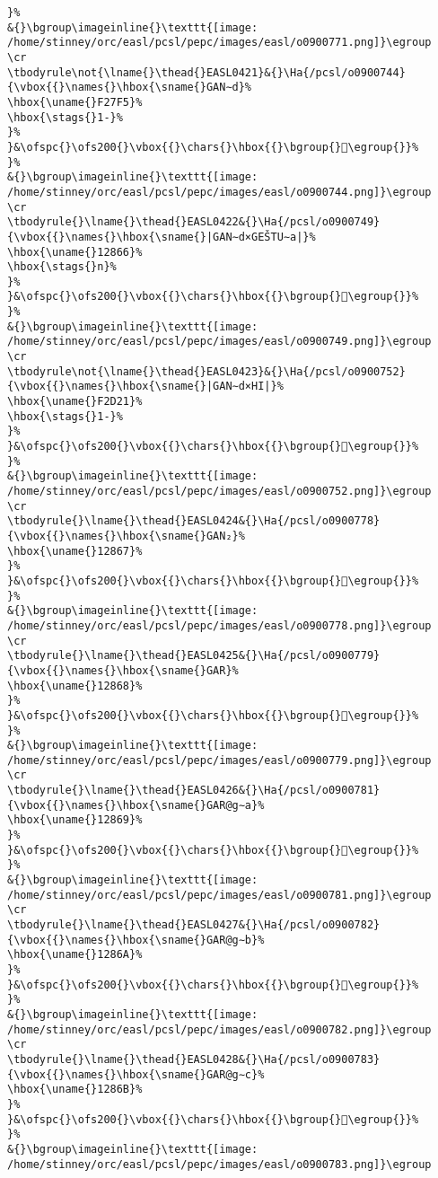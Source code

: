 \begin{verbatim}
}%
&{}\bgroup\imageinline{}\texttt{[image: /home/stinney/orc/easl/pcsl/pepc/images/easl/o0900771.png]}\egroup
\cr
\tbodyrule\not{\lname{}\thead{}EASL0421}&{}\Ha{/pcsl/o0900744}{\vbox{{}\names{}\hbox{\sname{}GAN∼d}%
\hbox{\uname{}F27F5}%
\hbox{\stags{}1-}%
}%
}&\ofspc{}\ofs200{}\vbox{{}\chars{}\hbox{{}\bgroup{}󲟵\egroup{}}%
}%
&{}\bgroup\imageinline{}\texttt{[image: /home/stinney/orc/easl/pcsl/pepc/images/easl/o0900744.png]}\egroup
\cr
\tbodyrule{}\lname{}\thead{}EASL0422&{}\Ha{/pcsl/o0900749}{\vbox{{}\names{}\hbox{\sname{}|GAN∼d×GEŠTU∼a|}%
\hbox{\uname{}12866}%
\hbox{\stags{}n}%
}%
}&\ofspc{}\ofs200{}\vbox{{}\chars{}\hbox{{}\bgroup{}𒡦\egroup{}}%
}%
&{}\bgroup\imageinline{}\texttt{[image: /home/stinney/orc/easl/pcsl/pepc/images/easl/o0900749.png]}\egroup
\cr
\tbodyrule\not{\lname{}\thead{}EASL0423}&{}\Ha{/pcsl/o0900752}{\vbox{{}\names{}\hbox{\sname{}|GAN∼d×HI|}%
\hbox{\uname{}F2D21}%
\hbox{\stags{}1-}%
}%
}&\ofspc{}\ofs200{}\vbox{{}\chars{}\hbox{{}\bgroup{}󲴡\egroup{}}%
}%
&{}\bgroup\imageinline{}\texttt{[image: /home/stinney/orc/easl/pcsl/pepc/images/easl/o0900752.png]}\egroup
\cr
\tbodyrule{}\lname{}\thead{}EASL0424&{}\Ha{/pcsl/o0900778}{\vbox{{}\names{}\hbox{\sname{}GAN₂}%
\hbox{\uname{}12867}%
}%
}&\ofspc{}\ofs200{}\vbox{{}\chars{}\hbox{{}\bgroup{}𒡧\egroup{}}%
}%
&{}\bgroup\imageinline{}\texttt{[image: /home/stinney/orc/easl/pcsl/pepc/images/easl/o0900778.png]}\egroup
\cr
\tbodyrule{}\lname{}\thead{}EASL0425&{}\Ha{/pcsl/o0900779}{\vbox{{}\names{}\hbox{\sname{}GAR}%
\hbox{\uname{}12868}%
}%
}&\ofspc{}\ofs200{}\vbox{{}\chars{}\hbox{{}\bgroup{}𒡨\egroup{}}%
}%
&{}\bgroup\imageinline{}\texttt{[image: /home/stinney/orc/easl/pcsl/pepc/images/easl/o0900779.png]}\egroup
\cr
\tbodyrule{}\lname{}\thead{}EASL0426&{}\Ha{/pcsl/o0900781}{\vbox{{}\names{}\hbox{\sname{}GAR@g∼a}%
\hbox{\uname{}12869}%
}%
}&\ofspc{}\ofs200{}\vbox{{}\chars{}\hbox{{}\bgroup{}𒡩\egroup{}}%
}%
&{}\bgroup\imageinline{}\texttt{[image: /home/stinney/orc/easl/pcsl/pepc/images/easl/o0900781.png]}\egroup
\cr
\tbodyrule{}\lname{}\thead{}EASL0427&{}\Ha{/pcsl/o0900782}{\vbox{{}\names{}\hbox{\sname{}GAR@g∼b}%
\hbox{\uname{}1286A}%
}%
}&\ofspc{}\ofs200{}\vbox{{}\chars{}\hbox{{}\bgroup{}𒡪\egroup{}}%
}%
&{}\bgroup\imageinline{}\texttt{[image: /home/stinney/orc/easl/pcsl/pepc/images/easl/o0900782.png]}\egroup
\cr
\tbodyrule{}\lname{}\thead{}EASL0428&{}\Ha{/pcsl/o0900783}{\vbox{{}\names{}\hbox{\sname{}GAR@g∼c}%
\hbox{\uname{}1286B}%
}%
}&\ofspc{}\ofs200{}\vbox{{}\chars{}\hbox{{}\bgroup{}𒡫\egroup{}}%
}%
&{}\bgroup\imageinline{}\texttt{[image: /home/stinney/orc/easl/pcsl/pepc/images/easl/o0900783.png]}\egroup

\end{verbatim}
